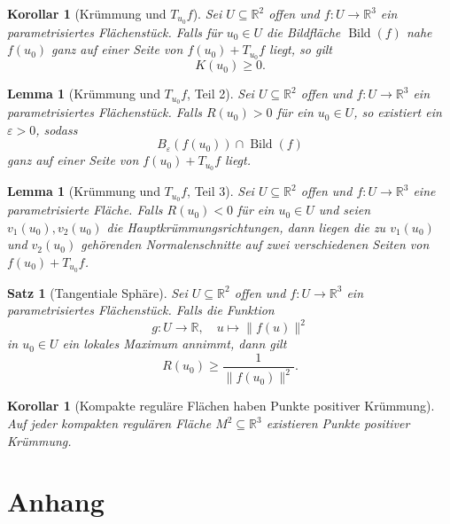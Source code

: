 \documentclass[a4paper,12pt]{article}
\theoremstyle{break}
\newtheorem{theorem}[definition]{Satz}
\newtheorem{lemma}[definition]{Lemma}
\newtheorem{corollary}[definition]{Korollar}
\begin{document}
\begin{corollary}[Krümmung und \( T_{u_0} f \)]
Sei \( U \subseteq \mathbb{R}^2 \) offen und \( f: U \to \mathbb{R}^3 \) ein parametrisiertes Flächenstück.  
Falls für \( u_0 \in U \) die Bildfläche \( \operatorname{Bild}(f) \) nahe \( f(u_0) \) ganz auf einer Seite von \( f(u_0) + T_{u_0} f \) liegt, so gilt  
\[
K(u_0) \geq 0.
\]
\end{corollary}

\begin{lemma}[Krümmung und \( T_{u_0} f \), Teil 2]
Sei \( U \subseteq \mathbb{R}^2 \) offen und \( f: U \to \mathbb{R}^3 \) ein parametrisiertes Flächenstück.  
Falls \( R(u_0) > 0 \) für ein \( u_0 \in U \), so existiert ein \( \varepsilon > 0 \), sodass  
\[
B_{\varepsilon}(f(u_0)) \cap \operatorname{Bild}(f)
\]
ganz auf einer Seite von \( f(u_0) + T_{u_0} f \) liegt.
\end{lemma}

\begin{lemma}[Krümmung und \( T_{u_0} f \), Teil 3]
Sei \( U \subseteq \mathbb{R}^2 \) offen und \( f: U \to \mathbb{R}^3 \) eine parametrisierte Fläche.  
Falls \( R(u_0) < 0 \) für ein \( u_0 \in U \) und seien \( v_1(u_0), v_2(u_0) \) die Hauptkrümmungsrichtungen,  
dann liegen die zu \( v_1(u_0) \) und \( v_2(u_0) \) gehörenden Normalenschnitte auf zwei verschiedenen Seiten von \( f(u_0) + T_{u_0} f \).
\end{lemma}

\begin{theorem}[Tangentiale Sphäre]
Sei \( U \subseteq \mathbb{R}^2 \) offen und \( f: U \to \mathbb{R}^3 \) ein parametrisiertes Flächenstück.  
Falls die Funktion  
\[
g: U \to \mathbb{R}, \quad u \mapsto \| f(u) \|^2
\]
in \( u_0 \in U \) ein lokales Maximum annimmt, dann gilt  
\[
R(u_0) \geq \frac{1}{\| f(u_0) \|^2}.
\]
\end{theorem}

\begin{corollary}[Kompakte reguläre Flächen haben Punkte positiver Krümmung]
Auf jeder kompakten regulären Fläche \( M^2 \subseteq \mathbb{R}^3 \) existieren Punkte positiver Krümmung.
\end{corollary}

\section{Anhang}
\end{document}

